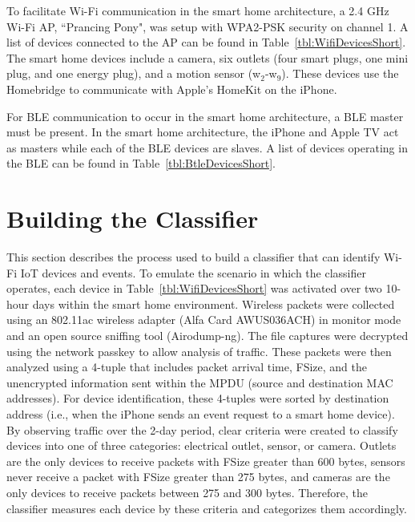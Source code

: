 \documentclass[conference]{./IEEEtran/IEEEtran}
\begin{document}
To facilitate Wi-Fi communication in the smart home architecture, a 2.4 GHz Wi-Fi \ac{AP}, ``Prancing Pony", was setup with \ac{WPA2-PSK} security on channel 1. A list of devices connected to the \ac{AP} can be found in Table~\ref{tbl:WifiDevicesShort}. The smart home devices include a camera, six outlets (four smart plugs, one mini plug, and one energy plug), and a motion sensor (w$ _2 $-w$ _9 $). These devices use the Homebridge to communicate with Apple's HomeKit on the iPhone. 

For \ac{BLE} communication to occur in the smart home architecture, a \ac{BLE} master must be present. In the smart home architecture, the iPhone and Apple TV act as masters while each of the \ac{BLE} devices are slaves. A list of devices operating in the \ac{BLE} can be found in Table~\ref{tbl:BtleDevicesShort}.

\tableWifiDeviceShort

\section{Building the Classifier}\label{classifier}

This section describes the process used to build a classifier that can identify Wi-Fi \ac{IoT} devices and events. To emulate the scenario in which the classifier operates, each device in Table~\ref{tbl:WifiDevicesShort} was activated over two 10-hour days within the smart home environment.  Wireless packets were collected using an 802.11ac wireless adapter (Alfa Card AWUS036ACH) in monitor mode and an open source sniffing tool (Airodump-ng). The file captures were decrypted using the network passkey to allow analysis of traffic. These packets were then analyzed using a 4-tuple that includes packet arrival time, \ac{FSize}, and the unencrypted information sent within the \ac{MPDU} (source and destination \ac{MAC} addresses). For device identification, these 4-tuples were sorted by destination address (i.e., when the iPhone sends an event request to a smart home device). By observing traffic over the 2-day period, clear criteria were created to classify devices into one of three categories: electrical outlet, sensor, or camera. Outlets are the only devices to receive packets with \ac{FSize} greater than 600 bytes, sensors never receive a packet with \ac{FSize} greater than 275 bytes, and cameras are the only devices to receive packets between 275 and 300 bytes. Therefore, the classifier measures each device by these criteria and categorizes them accordingly.
\end{document}
